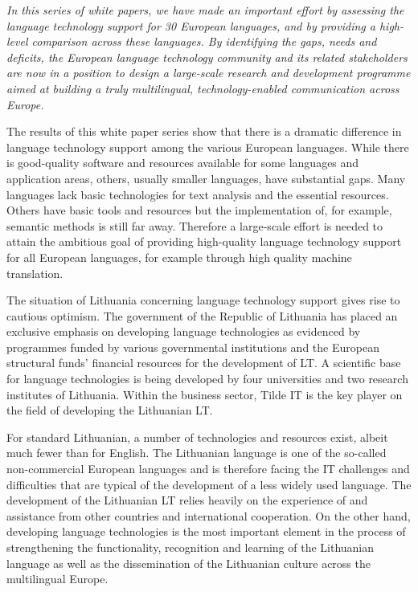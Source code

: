 \begin{multicols}{2}
\emph{In this series of white papers, we have made an important effort by assessing the language technology support for 30 European languages, and by providing a high-level comparison across these languages. By identifying the gaps, needs and deficits, the European language technology community and its related stakeholders are now in a position to design a large-scale research and development programme aimed at building a truly multilingual, technology-enabled communication across Europe.}

The results of this white paper series show that there is a dramatic difference in language technology support among the various European languages. While there is good-quality software and resources available for some languages and application areas, others, usually smaller languages, have substantial gaps. Many languages lack basic technologies for text analysis and the essential resources. Others have basic tools and resources but the implementation of, for example, semantic methods is still far away. Therefore a large-scale effort is needed to attain the ambitious goal of providing high-quality language technology support for all European languages, for example through high quality machine translation. 

The situation of Lithuania concerning language technology support gives rise to cautious optimism. The government of the Republic of Lithuania has placed an exclusive emphasis on developing language technologies as evidenced by programmes funded by various governmental institutions and the European structural funds’ financial resources for the development of LT. A scientific base for language technologies is being developed by four universities and two research institutes of Lithuania. Within the business sector, Tilde IT is the key player on the field of developing the Lithuanian LT.

    For standard Lithuanian, a number of technologies and resources exist, albeit much fewer than for English. The Lithuanian language is one of the so-called non-commercial European languages and is therefore facing the IT challenges and difficulties that are typical of the development of a less widely used language. The development of the Lithuanian LT relies heavily on the experience of and assistance from other countries and international cooperation. On the other hand, developing language technologies is the most important element in the process of strengthening the functionality, recognition and learning of the Lithuanian language as well as the dissemination of the Lithuanian culture across the multilingual Europe.


\end{multicols}
